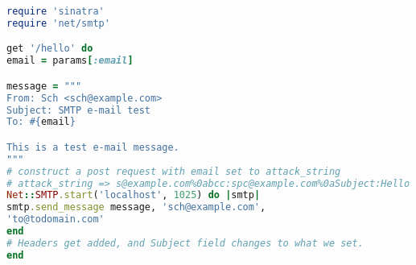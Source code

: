 \begin{lstlisting}[language=Ruby,caption={Ruby program with e-mail
      header injection vulnerability.},label={code:rubyemi}, float]
require 'sinatra'
require 'net/smtp'

get '/hello' do
email = params[:email]

message = """
From: Sch <sch@example.com>
Subject: SMTP e-mail test
To: #{email}

This is a test e-mail message.
"""
# construct a post request with email set to attack_string
# attack_string => s@example.com%0abcc:spc@example.com%0aSubject:Hello
Net::SMTP.start('localhost', 1025) do |smtp|
smtp.send_message message, 'sch@example.com',
'to@todomain.com'
end
# Headers get added, and Subject field changes to what we set.
end
\end{lstlisting}
